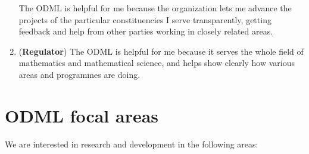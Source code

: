 \documentclass{article}
\begin{document}
\begin{enumerate}
The ODML is helpful for me because the organization lets me advance the projects of the particular constituencies I serve transparently, getting feedback and help from other parties working in closely related areas.\label{advocate}
\item(\textbf{Regulator})
The ODML is helpful for me because it serves the whole field of mathematics and mathematical science, and helps show clearly how various areas and programmes are doing.\label{regulator}
\end{enumerate}

\section{ODML focal areas}

We are interested in research and development in the following areas:
\end{document}
